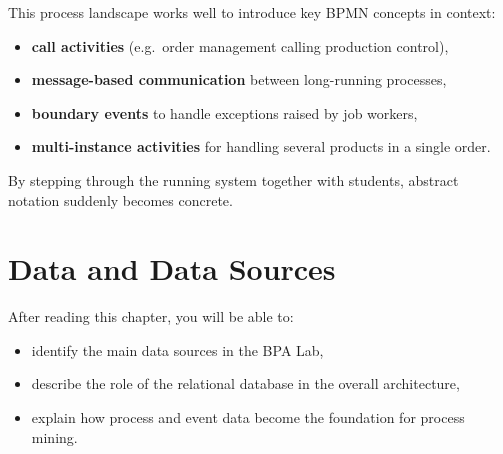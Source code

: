 \documentclass[
  english,
  11pt,
  a4paper,
]{scrbook}
\providecommand{\tightlist}{%
  \setlength{\itemsep}{0pt}\setlength{\parskip}{0pt}}
\begin{document}
\begin{tcolorbox}[enhanced jigsaw, arc=.35mm, bottomrule=.15mm, bottomtitle=1mm, breakable, colback=white, colbacktitle=quarto-callout-tip-color!10!white, colframe=quarto-callout-tip-color-frame, coltitle=black, left=2mm, leftrule=.75mm, opacityback=0, opacitybacktitle=0.6, rightrule=.15mm, title=\textcolor{quarto-callout-tip-color}{\faLightbulb}\hspace{0.5em}{Process landscape as a teaching tool}, titlerule=0mm, toprule=.15mm, toptitle=1mm]

This process landscape works well to introduce key BPMN concepts in
context:

\begin{itemize}
\tightlist
\item
  \textbf{call activities} (e.g.~order management calling production
  control),
\item
  \textbf{message-based communication} between long-running processes,
\item
  \textbf{boundary events} to handle exceptions raised by job workers,
\item
  \textbf{multi-instance activities} for handling several products in a
  single order.
\end{itemize}

By stepping through the running system together with students, abstract
notation suddenly becomes concrete.

\end{tcolorbox}


\chapter{Data and Data Sources}\label{data-and-data-sources}

\begin{tcolorbox}[enhanced jigsaw, arc=.35mm, bottomrule=.15mm, bottomtitle=1mm, breakable, colback=white, colbacktitle=quarto-callout-note-color!10!white, colframe=quarto-callout-note-color-frame, coltitle=black, left=2mm, leftrule=.75mm, opacityback=0, opacitybacktitle=0.6, rightrule=.15mm, title=\textcolor{quarto-callout-note-color}{\faInfo}\hspace{0.5em}{Learning objectives}, titlerule=0mm, toprule=.15mm, toptitle=1mm]

After reading this chapter, you will be able to:

\begin{itemize}
\tightlist
\item
  identify the main data sources in the BPA Lab,
\item
  describe the role of the relational database in the overall
  architecture,
\item
  explain how process and event data become the foundation for process
  mining.
\end{itemize}

\end{tcolorbox}
\end{document}
